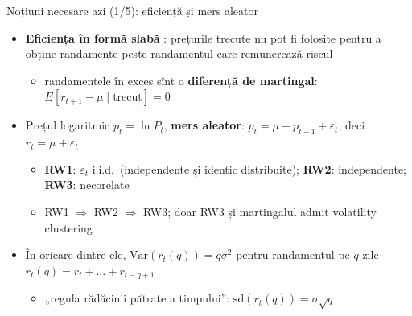 \begin{frame}{Noțiuni necesare azi (1/5): eficiență și mers aleator}
\itemsize{\small}
\begin{itemize}
    \item \textbf{Eficiența în formă slabă} : prețurile trecute nu pot fi folosite pentru a obține randamente peste randamentul care remunerează riscul
    \begin{itemize}
        \item randamentele în exces sînt o \textbf{diferență de martingal}: $E[r_{t+1} - \mu \mid \text{trecut}] = 0$
    \end{itemize}
    \item Prețul logaritmic $p_t = \ln P_t$, \textbf{mers aleator}: $p_t = \mu + p_{t-1} + \varepsilon_t$, deci $r_t = \mu + \varepsilon_t$ 
    \begin{itemize}
        \item \textbf{RW1}: $\varepsilon_t$ i.i.d.\ (independente și identic distribuite); \textbf{RW2}: independente; \textbf{RW3}: necorelate
        \item RW1 $\Rightarrow$ RW2 $\Rightarrow$ RW3; doar RW3 și martingalul admit volatility clustering
    \end{itemize}
    \item În oricare dintre ele, $\mathrm{Var}(r_t(q)) = q\sigma^2$ pentru randamentul pe $q$ zile $r_t(q) = r_t + \dots + r_{t-q+1}$
    \begin{itemize}
        \item „regula rădăcinii pătrate a timpului”: $\mathrm{sd}(r_t(q)) = \sigma\sqrt{q}$
    \end{itemize}
\end{itemize}
\end{frame}

